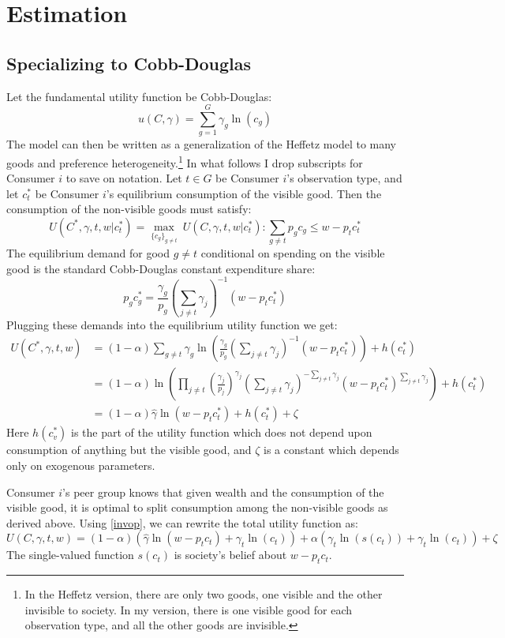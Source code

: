 \documentclass[12pt]{article}
\begin{document}
\section{Estimation}
\subsection{Specializing to Cobb-Douglas}
Let the fundamental utility function be Cobb-Douglas:
\[u(C,\gamma) = \sum_{g=1}^{G} \gamma_g \ln(c_g)\]
The model can then be written as a generalization of the Heffetz model to many goods and preference heterogeneity.\footnote{ In the Heffetz version, there are only two goods, one visible and the other invisible to society. In my version, there is one visible good for each observation type, and all the other goods are invisible.}
In what follows I drop subscripts for Consumer $i$ to save on notation. Let $t \in G$ be Consumer $i$'s observation type, and let $c_{t}^*$ be Consumer $i$'s equilibrium consumption of the visible good.
Then the consumption of the non-visible goods must satisfy:
\[ U(C^*,\gamma,t,w|c_t^*)=\underset{\{c_g\}_{g\neq t}}{\max} \ U(C,\gamma,t,w|c_t^*) :  \sum_{g \neq t} p_g c_g \le w-p_t c_t^*\]
The equilibrium demand for good $g\neq t$ conditional on spending on the visible good is the standard Cobb-Douglas constant expenditure share:
\[p_g c_g^* = \frac{\gamma_g}{p_g}\left(\sum_{j\neq t} \gamma_j\right)^{-1}\left(w-p_t c_t^* \right)\]
Plugging these demands into the equilibrium utility function we get:
\begin{align}
	U(C^*,\gamma,t,w) &= (1-\alpha)\sum_{g\neq t} \gamma_g \ln\left(\frac{\gamma_g}{p_g}\left(\sum_{j\neq t} \gamma_j\right)^{-1}\left(w-p_t c_t^* \right)\right) + h(c_t^*) \nonumber \\ 
	&= (1-\alpha) \ln\left(\prod_{j\neq t} \left(\frac{\gamma_j}{p_j}\right)^{\gamma_j}\left(\sum_{j\neq t} \gamma_j\right)^{-\sum_{j\neq t} \gamma_j}\left(w-p_t c_t^* \right)^{\sum_{j\neq t} \gamma_j}\right) + h(c_t^*) \nonumber \\ 
	\label{invop}
	&= (1-\alpha) \hat{\gamma} \ln \left(w-p_t c_t^*\right) + h(c_t^*) + \zeta
\end{align}
Here $h(c_v^*)$ is the part of the utility function which does not depend upon consumption of anything but the visible good, and $\zeta$ is a constant which depends only on exogenous parameters.

Consumer $i$'s peer group knows that given wealth and the consumption of the visible good, it is optimal to split consumption among the non-visible goods as derived above.  Using \eqref{invop}, we can rewrite the total utility function as: 
\begin{equation}
	\label{ufun}
	U(C,\gamma,t,w) = (1-\alpha) \left(\hat{\gamma} \ln \left(w-p_t c_t\right) + \gamma_t \ln \left(c_t \right)\right) + \alpha \left(\gamma_t \ln \left(s(c_t)\right) + \gamma_t \ln \left(c_t\right) \right) + \zeta
	 \end{equation}
The single-valued function $s(c_t)$ is society's belief about $w-p_t c_t$. 
\end{document}

